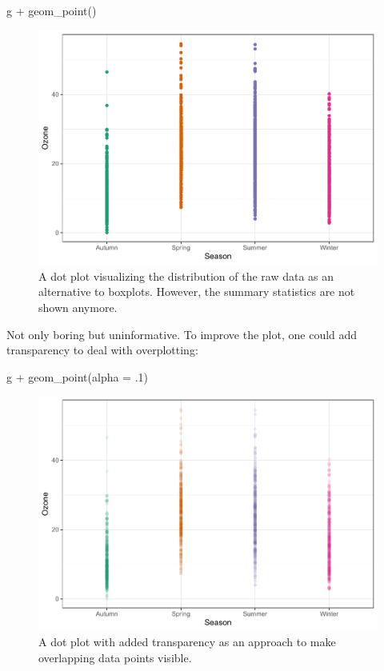 \documentclass[
]{krantz}
\makeatletter
\newenvironment{Shaded}{\begin{snugshade}}{\end{snugshade}}
\newcommand{\AttributeTok}[1]{\textcolor[rgb]{0.61,0.61,0.61}{#1}}
\newcommand{\DecValTok}[1]{\textcolor[rgb]{0.06,0.06,0.06}{#1}}
\newcommand{\FunctionTok}[1]{\textcolor[rgb]{0,0,0}{#1}}
\newcommand{\NormalTok}[1]{#1}
\newcommand{\SpecialCharTok}[1]{\textcolor[rgb]{0,0,0}{#1}}
\newenvironment{kframe}{%
\medskip{}
\setlength{\fboxsep}{.8em}
 \def\at@end@of@kframe{}%
 \ifinner\ifhmode%
  \def\at@end@of@kframe{\end{minipage}}%
  \begin{minipage}{\columnwidth}%
 \fi\fi%
 \def\FrameCommand##1{\hskip\@totalleftmargin \hskip-\fboxsep
 \colorbox{shadecolor}{##1}\hskip-\fboxsep
     \hskip-\linewidth \hskip-\@totalleftmargin \hskip\columnwidth}%
 \MakeFramed {\advance\hsize-\width
   \@totalleftmargin\z@ \linewidth\hsize
   \@setminipage}}%
 {\par\unskip\endMakeFramed%
 \at@end@of@kframe}
\renewenvironment{Shaded}{\begin{kframe}}{\end{kframe}}
\makeatother
\begin{document}
\begin{Shaded}
\begin{Highlighting}[]
\NormalTok{g }\SpecialCharTok{+} \FunctionTok{geom\_point}\NormalTok{()}
\end{Highlighting}
\end{Shaded}

\begin{figure}
\centering
\includegraphics{bookdown_files/figure-latex/point-1.pdf}
\caption{\label{fig:point}A dot plot visualizing the distribution of the raw data as an alternative to boxplots. However, the summary statistics are not shown anymore.}
\end{figure}

Not only boring but uninformative. To improve the plot, one could add transparency to deal with overplotting:

\begin{Shaded}
\begin{Highlighting}[]
\NormalTok{g }\SpecialCharTok{+} \FunctionTok{geom\_point}\NormalTok{(}\AttributeTok{alpha =}\NormalTok{ .}\DecValTok{1}\NormalTok{)}
\end{Highlighting}
\end{Shaded}

\begin{figure}
\centering
\includegraphics{bookdown_files/figure-latex/point-alpha-1.pdf}
\caption{\label{fig:point-alpha}A dot plot with added transparency as an approach to make overlapping data points visible.}
\end{figure}
\end{document}
